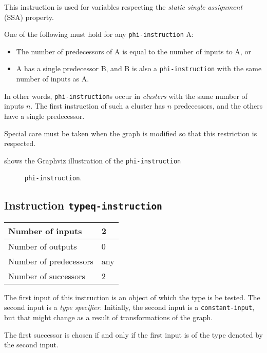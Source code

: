 This instruction is used for variables respecting the \emph{static
  single assignment} (SSA) property.  

One of the following must hold for any \texttt{phi-instruction} A:

\begin{itemize}
\item The number of predecessors of A is equal to the number of inputs
  to A, or
\item A has a single predecessor B, and B is also a
  \texttt{phi-instruction} with the same number of inputs as A.
\end{itemize}

In other words, \texttt{phi-instruction}s occur in \emph{clusters}
with the same number of inputs $n$.  The first instruction of such a
cluster has $n$ predecessors, and the others have a single
predecessor. 

Special care must be taken when the graph is modified so that this
restriction is respected. 

 shows the Graphviz illustration of the
\texttt{phi-instruction}

\begin{figure}
\begin{center}
\end{center}
\caption{\label{fig-phi-instruction}
\texttt{phi-instruction}.}
\end{figure}

\subsection{Instruction \texttt{typeq-instruction}}
\label{mir-instruction-typeq}

\begin{tabular}{|l|l|}
\hline
Number of inputs & 2\\
\hline
Number of outputs & 0\\
\hline
Number of predecessors & any\\
\hline
Number of successors & 2\\
\hline
\end{tabular}

The first input of this instruction is an object of which the type
is be tested.  The second input is a \emph{type specifier}.
Initially, the second input is a \texttt{constant-input}, but that
might change as a result of transformations of the graph.  

The first successor is chosen if and only if the first input is of the
type denoted by the second input. 


